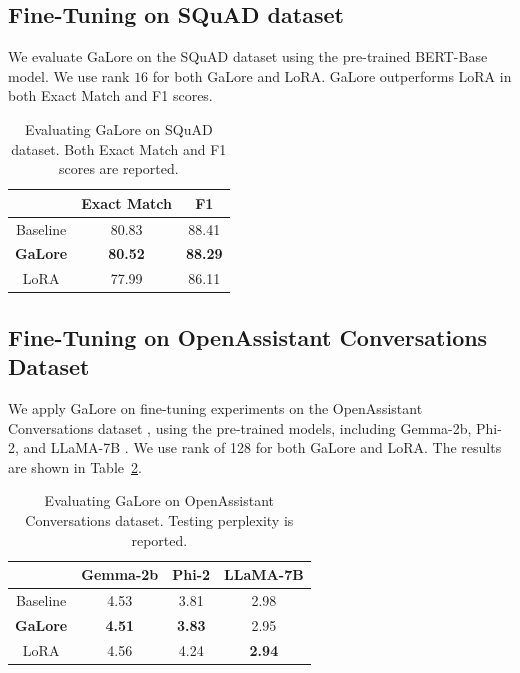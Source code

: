\subsection{Fine-Tuning on SQuAD dataset}
We evaluate GaLore on the SQuAD dataset \citep{rajpurkarSQuAD1000002016} using the pre-trained BERT-Base model. We use rank $16$ for both GaLore and LoRA. GaLore outperforms LoRA in both Exact Match and F1 scores.
\begin{table}[h]
    \caption{Evaluating GaLore on SQuAD dataset. Both Exact Match and F1 scores are reported.}
    \label{tab:fine_tuning_squad}
    \centering
    \begin{tabular}{ccc} %
    \toprule
            & \textbf{Exact Match} & \textbf{F1} \\
    \midrule
    Baseline & 80.83 & 88.41 \\
    \midrule
    \textbf{GaLore} & \textbf{80.52} & \textbf{88.29}  \\
    LoRA & 77.99 & 86.11  \\
    \bottomrule
    \end{tabular}
    \vskip -0.1in
\end{table}

\subsection{Fine-Tuning on OpenAssistant Conversations Dataset}
We apply GaLore on fine-tuning experiments on the OpenAssistant Conversations dataset \citep{kopfOpenAssistantConversationsDemocratizing2023}, using the pre-trained models, including Gemma-2b, Phi-2, and LLaMA-7B \citep{touvronLlamaOpenFoundation2023,gemmateamGemmaOpenModels2024}. We use rank of 128 for both GaLore and LoRA. The results are shown in Table~\ref{tab:fine_tuning_oasst}.

\begin{table}[h]
    \caption{Evaluating GaLore on OpenAssistant Conversations dataset. Testing perplexity is reported.}
    \label{tab:fine_tuning_oasst}
    \centering
    \begin{tabular}{cccc} %
    \toprule
            & \textbf{Gemma-2b} & \textbf{Phi-2} & \textbf{LLaMA-7B} \\
    \midrule
    Baseline & 4.53 & 3.81 & 2.98 \\
    \midrule
    \textbf{GaLore} & \textbf{4.51} & \textbf{3.83} & 2.95 \\
    LoRA & 4.56 & 4.24 & \textbf{2.94} \\
    \bottomrule
    \end{tabular}
    \vskip -0.1in
\end{table}


